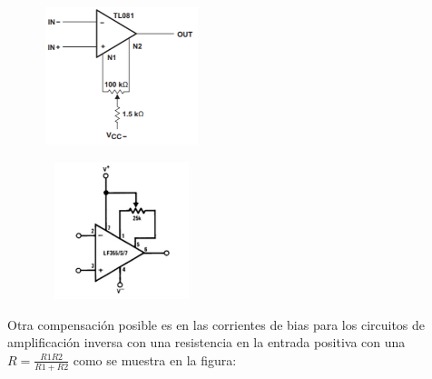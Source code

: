 \begin{itemize}
    \begin{minipage}{.4\textwidth}
    \begin{center}
        \includegraphics[width = 0.5\textwidth, height = 4cm]{../Ejercicio2-MediciondeBias/Informe/comptl081.png}
        \captionsetup{justification=centering}
        \label{ej2comp081} 
    \end{center}
    \end{minipage}
    \hspace{0.5cm}
    \begin{minipage}{.4\textwidth}
    \begin{center}
        \includegraphics[width = 0.5\textwidth, height = 4cm]{../Ejercicio2-MediciondeBias/Informe/complm365.png}
        \captionsetup{justification=centering}
        \label{ej2comp365} 
    \end{center}
    \end{minipage}
    
    Otra compensación posible es en las corrientes de bias para los circuitos de amplificación inversa con una resistencia en la entrada positiva con una $R = \frac{R1R2}{R1+R2}$ como se muestra en la figura:
    

\end{itemize}
